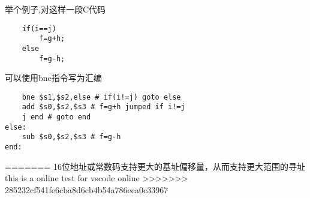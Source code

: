 举个例子,对这样一段C代码
\begin{lstlisting}
    if(i==j)
        f=g+h;
    else
        f=g-h;
\end{lstlisting}
可以使用bne指令写为汇编
\begin{lstlisting}
    bne $s1,$s2,else # if(i!=j) goto else
    add $s0,$s2,$s3 # f=g+h jumped if i!=j
    j end # goto end
else:
    sub $s0,$s2,$s3 # f=g-h
end:
\end{lstlisting}















=======
16位地址或常数码支持更大的基址偏移量，从而支持更大范围的寻址\\
this is a online test for vscode online 
>>>>>>> 285232cf541fe6cba8d6cb4b54a786eca0c33967



